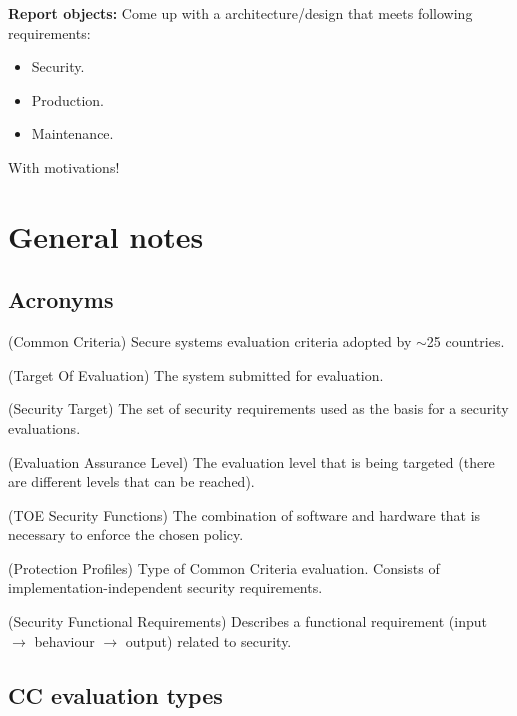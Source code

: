 \documentclass[10pt]{article}
\begin{document}
  \textbf{Report objects:}
  Come up with a architecture/design that meets following requirements:
  \begin{itemize}
    \item{Security.}
    \item{Production.}
    \item{Maintenance.}
  \end{itemize}
  With motivations!

  \section{General notes}

    \subsection{Acronyms}

    \begin{description}[style=multiline,leftmargin=1.7cm]
      \item[CC]{
          (Common Criteria) Secure systems evaluation criteria adopted by
          $\sim$25 countries.
      }
      \item[TOE]{
          (Target Of Evaluation) The system submitted for evaluation.
      }
      \item[ST]{
          (Security Target) The set of security requirements used as the basis
          for a security evaluations.
      }
      \item[EAL]{
          (Evaluation Assurance Level) The evaluation level that is being
          targeted (there are different levels that can be reached).
      }
      \item[TSF]{
          (TOE Security Functions) The combination of software and hardware
          that is necessary to enforce the chosen policy.
      }
      \item[PP]{
          (Protection Profiles) Type of Common Criteria evaluation. Consists of
          implementation-independent security requirements.
      }
      \item[SFR]{
          (Security Functional Requirements) Describes a functional requirement
          (input $\rightarrow$ behaviour $\rightarrow$ output) related to
          security.
      }
    \end{description}

    \subsection{CC evaluation types}
\end{document}

